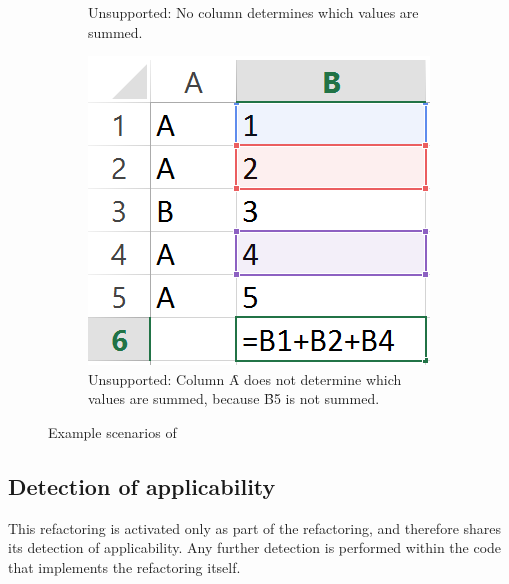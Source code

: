 \begin{figure}
\begin{subfigure}[t]{0.25\textwidth}
		\caption{Unsupported: \newline No column determines which values are summed.}
		\label{fig:introcondaggrScenario2}
	\end{subfigure}
	\hspace{0.05\textwidth}
	\begin{subfigure}[t]{0.25\textwidth}
		\includegraphics[width=\textwidth]{implementation/aggregate/scenario3}
		\caption{Unsupported: \newline Column \f{A} does not determine which values are summed, because \f{B5} is not summed.}
		\label{fig:introcondaggrScenario3}
	\end{subfigure}
	\caption{Example scenarios of }
	\label{fig:introcondaggrScenario}
\end{figure}

\subsection{Detection of applicability}

This refactoring is activated only as part of the  refactoring, and therefore shares its detection of applicability.
Any further detection is performed within the code that implements the refactoring itself.


